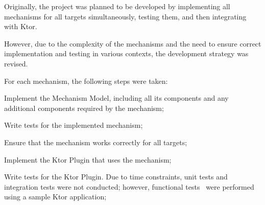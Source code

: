 Originally, the project was planned to be developed by implementing all mechanisms for all targets simultaneously, testing them, and then integrating with Ktor.

However, due to the complexity of the mechanisms and the need to ensure correct implementation and testing in various contexts, the development strategy was revised.

For each mechanism, the following steps were taken:
\begin{boldenumerate}
    \item Implement the Mechanism Model, including all its components and any additional components required by the mechanism;
    \item Write tests for the implemented mechanism;
    \item Ensure that the mechanism works correctly for all targets;
    \item Implement the Ktor Plugin that uses the mechanism;
    \item Write tests for the Ktor Plugin.
    Due to time constraints, unit tests and integration tests were not conducted; however, functional tests~\cite{software-test-types} were performed using a sample Ktor application;
\end{boldenumerate}
